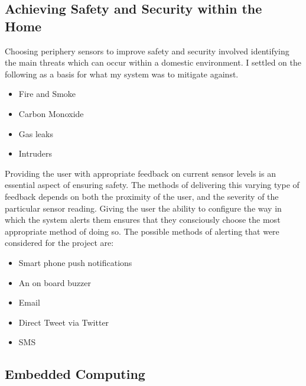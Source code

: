 \documentclass{article}
\begin{document}
\subsection{Achieving Safety and Security within the Home}
Choosing periphery sensors to improve safety and security involved identifying the main threats which can occur within a domestic environment. I settled on the following as a basis for what my system was to mitigate against.

\begin{itemize}
  \item Fire and Smoke
  \item Carbon Monoxide
  \item Gas leaks
  \item Intruders 
\end{itemize}

\noindent
Providing the user with appropriate feedback on current sensor levels is an essential aspect of ensuring safety. The methods of delivering this varying type of feedback depends on both the proximity of the user, and the severity of the particular sensor reading. Giving the user the ability to configure the way in which the system alerts them ensures that they consciously choose the most appropriate method of doing so. The possible methods of alerting that were considered for the project are:

\begin{itemize}
  \item Smart phone push notifications
  \item An on board buzzer
  \item Email	
  \item Direct Tweet via Twitter
  \item SMS 
\end{itemize}

\subsection{Embedded Computing}
\end{document}

